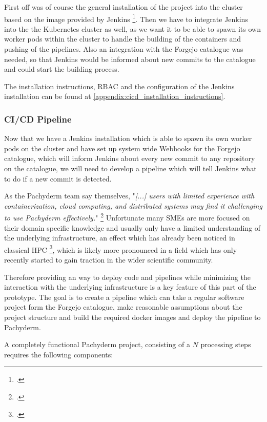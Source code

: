 First off was of course the general installation of the project into the cluster based on the image provided by Jenkins \footcite{JenkinsJenkinsJenkinsci}.
Then we have to integrate Jenkins into the the Kubernetes cluster as well, as we want it to be able to spawn its own worker pods within the cluster to handle the building of the containers and pushing of the pipelines.
Also an integration with the Forgejo catalogue was needed, so that Jenkins would be informed about new commits to the catalogue and could start the building process.

The installation instructions, \ac{RBAC} and the configuration of the Jenkins installation can be found at \ref{appendix:cicd_installation_instructions}.

\subsubsection{CI/CD Pipeline}

Now that we have a Jenkins installation which is able to spawn its own worker pods on the cluster and have set up system wide Webhooks for the Forgejo catalogue,
which will inform Jenkins about every new commit to any repository on the catalogue, we will need to develop a pipeline which will tell Jenkins what to do if a new commit is detected.

As the Pachyderm team say themselves, "\textit{[...] users with limited experience with containerization, cloud computing, and distributed systems may find it challenging to use Pachyderm effectively.}" \footcite{PachydermTargetAudience2023}
Unfortunate many \acp{SME} are more focused on their domain specific knowledge and usually only have a limited understanding of the underlying infrastructure, an effect which has already been noticed in classical \ac{HPC} \footcite{shenoiHPCEducationDomain2019}, 
which is likely more pronounced in a field which has only recently started to gain traction in the wider scientific community.

Therefore providing an way to deploy code and pipelines while minimizing the interaction with the underlying infrastructure is a key feature of this part of the prototype.
The goal is to create a pipeline which can take a regular software project form the Forgejo catalogue, make reasonable assumptions about the project structure and build the required docker images and deploy the pipeline to Pachyderm.

A completely functional Pachyderm project, consisting of a $N$ processing steps requires the following components:

